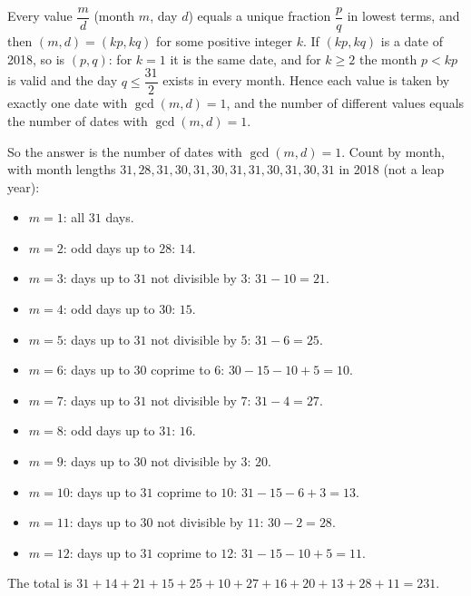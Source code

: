Every value $\dfrac {m}{d}$ (month $m$, day $d$) equals a unique fraction $\dfrac {p}{q}$ in lowest terms, and then $(m,d)=(kp,kq)$ for some positive integer $k$. If $(kp,kq)$ is a date of 2018, so is $(p,q)$: for $k=1$ it is the same date, and for $k\ge2$ the month $p<kp$ is valid and the day $q\le\dfrac{31}{2}$ exists in every month. Hence each value is taken by exactly one date with $\gcd(m,d)=1$, and the number of different values equals the number of dates with $\gcd(m,d)=1$.

So the answer is the number of dates with $\gcd(m,d)=1$. Count by month, with month lengths $31,28,31,30,31,30,31,31,30,31,30,31$ in 2018 (not a leap year):
\begin{itemize}
\item $m=1$: all $31$ days.
\item $m=2$: odd days up to $28$: $14$.
\item $m=3$: days up to $31$ not divisible by $3$: $31-10=21$.
\item $m=4$: odd days up to $30$: $15$.
\item $m=5$: days up to $31$ not divisible by $5$: $31-6=25$.
\item $m=6$: days up to $30$ coprime to $6$: $30-15-10+5=10$.
\item $m=7$: days up to $31$ not divisible by $7$: $31-4=27$.
\item $m=8$: odd days up to $31$: $16$.
\item $m=9$: days up to $30$ not divisible by $3$: $20$.
\item $m=10$: days up to $31$ coprime to $10$: $31-15-6+3=13$.
\item $m=11$: days up to $30$ not divisible by $11$: $30-2=28$.
\item $m=12$: days up to $31$ coprime to $12$: $31-15-10+5=11$.
\end{itemize}
The total is $31+14+21+15+25+10+27+16+20+13+28+11=\boxed{231}$.
